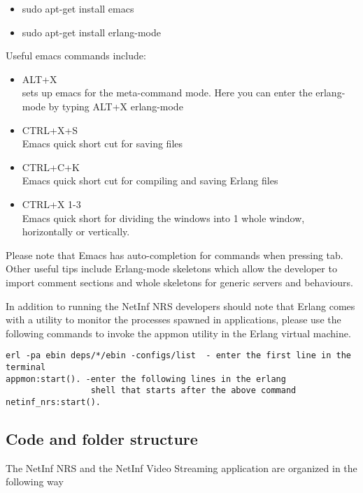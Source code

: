 \begin{itemize}
\item sudo apt-get install emacs
\item sudo apt-get install erlang-mode
\end{itemize}

Useful emacs commands include:

\begin{itemize}
\item ALT+X \\
sets up emacs for the meta-command mode. Here you can enter the erlang-mode by typing
ALT+X erlang-mode
\item CTRL+X+S \\
Emacs quick short cut for saving files
\item CTRL+C+K \\
Emacs quick short cut for compiling and saving Erlang files
\item CTRL+X 1-3 \\
Emacs quick short for dividing the windows into 1 whole window, horizontally or vertically.
\end{itemize}

Please note that Emacs has auto-completion for commands when pressing tab. Other useful tips include Erlang-mode skeletons which allow the developer to import comment sections and whole skeletons for generic servers and behaviours.

In addition to running the NetInf NRS developers should note that Erlang comes with a utility to monitor the processes spawned in applications, please use the following commands to invoke the appmon utility in the Erlang virtual machine.

\begin{verbatim}
erl -pa ebin deps/*/ebin -configs/list  - enter the first line in the terminal
appmon:start(). -enter the following lines in the erlang 
				 shell that starts after the above command
netinf_nrs:start().
\end{verbatim}

\subsection {Code and folder structure}

The NetInf NRS and the NetInf Video Streaming application are organized in the following way

